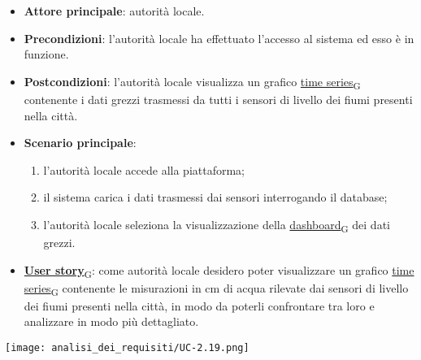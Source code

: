 \begin{itemize}
	\item \textbf{Attore principale}: autorità locale.
	\item \textbf{Precondizioni}: l'autorità locale ha effettuato l'accesso al sistema ed esso è in funzione.
	\item \textbf{Postcondizioni}: l'autorità locale visualizza un grafico \href{https://7last.github.io/docs/pb/documentazione-interna/glossario\#time-series}{time series\textsubscript{G}} contenente i dati grezzi trasmessi da tutti i sensori
	      di livello dei fiumi presenti nella città.
	\item \textbf{Scenario principale}:
	      \begin{enumerate}
		      \item l'autorità locale accede alla piattaforma;
		      \item il sistema carica i dati trasmessi dai sensori interrogando il database;
		      \item l'autorità locale seleziona la visualizzazione della \href{https://7last.github.io/docs/pb/documentazione-interna/glossario\#dashboard}{dashboard\textsubscript{G}} dei dati grezzi.
	      \end{enumerate}
	\item \href{https://7last.github.io/docs/pb/documentazione-interna/glossario\#user-story}{\textbf{User story}\textsubscript{G}}:
	      come autorità locale desidero poter visualizzare un grafico \href{https://7last.github.io/docs/pb/documentazione-interna/glossario\#time-series}{time series\textsubscript{G}} contenente le misurazioni in cm di acqua rilevate dai sensori
	      di livello dei fiumi presenti nella città, in modo da poterli confrontare tra loro e analizzare in modo più dettagliato.
\end{itemize}
\begin{center}
	\texttt{[image: analisi\_dei\_requisiti/UC-2.19.png]}
\end{center}


